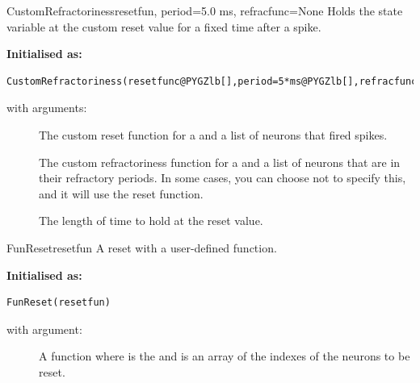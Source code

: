 \documentclass[letterpaper,10pt,english]{manual}
\begin{document}
\hypertarget{brian.CustomRefractoriness}{}\begin{classdesc}{CustomRefractoriness}{resetfun, period=5.0 ms, refracfunc=None}
Holds the state variable at the custom reset value for a fixed time after a spike.

\textbf{Initialised as:}

\begin{Verbatim}[commandchars=@\[\]]
CustomRefractoriness(resetfunc@PYGZlb[],period=5*ms@PYGZlb[],refracfunc=resetfunc@PYGZrb[]@PYGZrb[])
\end{Verbatim}

with arguments:
\begin{description}
\item[]
The custom reset function  for  a
\hyperlink{brian.NeuronGroup}{} and  a list of neurons that
fired spikes.

\item[]
The custom refractoriness function  for  a
\hyperlink{brian.NeuronGroup}{} and  a list of neurons that are in
their refractory periods. In some cases, you can choose not to specify this,
and it will use the reset function.

\item[]
The length of time to hold at the reset value.

\end{description}
\end{classdesc}

\hypertarget{brian.FunReset}{}\begin{classdesc}{FunReset}{resetfun}
A reset with a user-defined function.

\textbf{Initialised as:}

\begin{Verbatim}[commandchars=@\[\]]
FunReset(resetfun)
\end{Verbatim}

with argument:
\begin{description}
\item[]
A function  where  is the
\hyperlink{brian.NeuronGroup}{} and  is an array of
the indexes of the neurons to be reset.

\end{description}
\end{classdesc}
\end{document}
